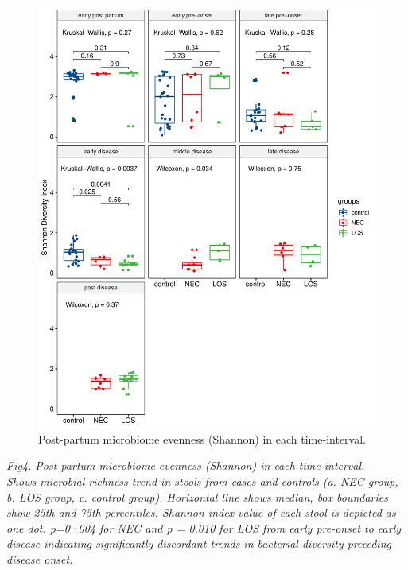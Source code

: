 \documentclass[fleqn,10pt]{wlpeerj} %
\begin{document}
    \begin{figure}[ht]\centering
      \includegraphics[width=\linewidth]{figure/shannon-time-groups.pdf}
      \caption{Post-partum microbiome evenness (Shannon) in each time-interval. }
      \label{fig:shannon-time-groups}
    \end{figure}
    \textit{Fig4. Post-partum microbiome evenness (Shannon) in each time-interval. \\ Shows microbial richness trend in stools from cases and controls (a. NEC group, b. LOS group, c. control group). Horizontal line shows median, box boundaries show 25th and 75th percentiles.  Shannon index value of each stool is depicted as one dot. p=0·004 for NEC and p = 0.010 for LOS from early pre-onset to early disease indicating significantly discordant trends in bacterial diversity preceding disease onset. }
\end{document}
